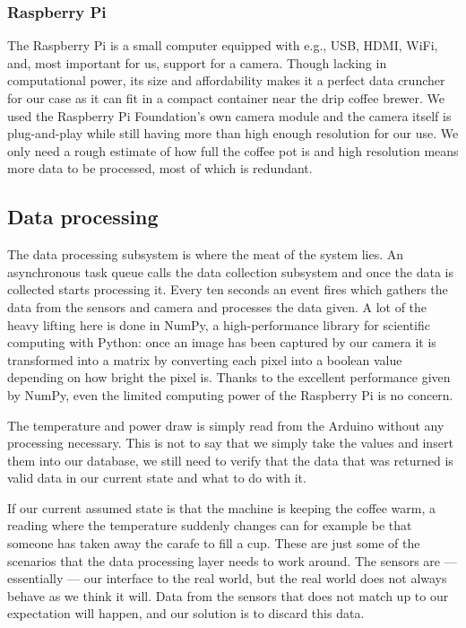\documentclass[12pt,a4paper,oneside,article]{memoir}
\numberwithin{equation}{chapter}
\begin{document}
\subsubsection{Raspberry Pi}\label{sec:raspberry-pi}
The Raspberry Pi is a small computer equipped with e.g., USB, HDMI, WiFi, 
and, most important for us, support for a camera. Though lacking in 
computational power, its size and affordability makes it a perfect data 
cruncher for our case as it can fit in a compact container near the drip 
coffee brewer. We used the Raspberry Pi Foundation's own camera module and the 
camera itself is plug-and-play while still having more than high enough 
resolution for our use. We only need a rough estimate of how full the coffee pot 
is and high resolution means more data to be processed, most of which is 
redundant.

\subsection{Data processing}\label{sec:data-processing}
The data processing subsystem is where the meat of the system lies. An 
asynchronous task queue calls the data collection subsystem and once the data is
collected starts processing it. Every ten seconds an event fires which gathers
the data from the sensors and camera and processes the data given. A lot of the
heavy lifting here is done in NumPy, a high-performance library for scientific
computing with Python: once an image has been captured by our camera it is
transformed into a matrix by converting each pixel into a boolean value
depending on how bright the pixel is. Thanks to the excellent performance given
by NumPy, even the limited computing power of the Raspberry Pi is no concern.

The temperature and power draw is simply read from the Arduino without any
processing necessary. This is not to say that we simply take the values and
insert them into our database, we still need to verify that the data that was
returned is valid data in our current state and what to do with it.

If our current assumed state is that the machine is keeping the coffee warm, a
reading where the temperature suddenly changes can for example be that someone
has taken away the carafe to fill a cup. These are just some of the scenarios
that the data processing layer needs to work around. The sensors are ---
essentially --- our interface to the real world, but the real world does not 
always behave as we think it will. Data from the sensors that does not match up 
to our expectation will happen, and our solution is to discard this data.
\end{document}
